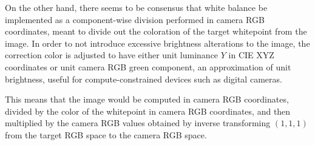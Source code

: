 On the other hand, there seems to be consensus that white balance be implemented as a component-wise
division performed in camera \gls{RGB} coordinates, meant to divide out the coloration of the target
whitepoint from the image. In order to not introduce excessive brightness alterations
to the image, the correction color is adjusted to have either unit luminance $Y$ in \gls{CIE} \gls{XYZ} 
coordinates or unit camera \gls{RGB} green component, an approximation of unit brightness, 
useful for compute-constrained devices such as digital cameras. 

This means that the image would be computed in camera \gls{RGB} coordinates, divided by the color of 
the whitepoint in camera \gls{RGB} coordinates, and then multiplied by the camera \gls{RGB} values 
obtained by inverse transforming $(1,1,1)$ from the target \gls{RGB} space to the camera \gls{RGB} 
space.


